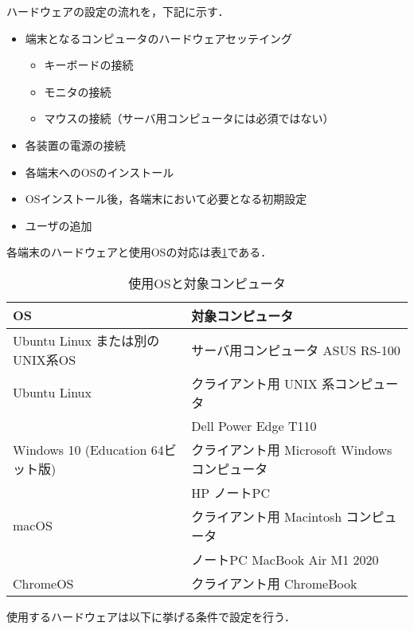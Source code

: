 ハードウェアの設定の流れを，下記に示す．
\begin{itemize}
  \item 端末となるコンピュータのハードウェアセッテイング
	\begin{itemize}
	 \item キーボードの接続
         \item モニタの接続
	 \item マウスの接続（サーバ用コンピュータには必須ではない）
	\end{itemize}
  \item 各装置の電源の接続
  \item 各端末へのOSのインストール
  \item OSインストール後，各端末において必要となる初期設定
  \item ユーザの追加
\end{itemize}


各端末のハードウェアと使用OSの対応は表\ref{tab:01:osandcomp}である．

\begin{table}[ht]
 \caption{使用OSと対象コンピュータ}
 \label{tab:01:osandcomp}
 \begin{center}
  \begin{tabular}{l|l}
    \hline
     OS  &  対象コンピュータ  \\
    \hline
     Ubuntu Linux または別の UNIX系OS & サーバ用コンピュータ ASUS RS-100   \\
     Ubuntu Linux & クライアント用 UNIX 系コンピュータ\\
            & Dell Power Edge T110 \\
     Windows 10 (Education 64ビット版)& クライアント用 Microsoft Windows
   コンピュータ \\
	   & HP ノートPC   \\
     macOS & クライアント用 Macintosh コンピュータ\\
     & ノートPC MacBook Air M1 2020 \\
     ChromeOS　& クライアント用 ChromeBook \\
    \hline
  \end{tabular}
 \end{center}
\end{table}

使用するハードウェアは以下に挙げる条件で設定を行う．

